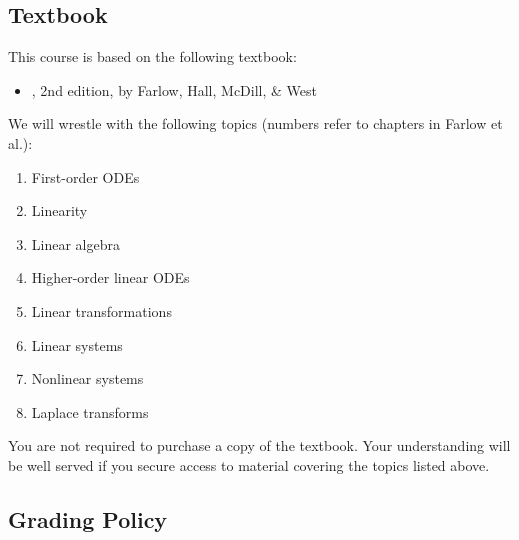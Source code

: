 \subsection{Textbook}

This course is based on the following textbook:
\begin{itemize}
\item \href{https://www.pearson.com/us/higher-education/program/Farlow-Differential-Equations-and-Linear-Algebra-Classic-Version-2nd-Edition/PGM1714691.html}{}, 2nd edition, by Farlow, Hall, McDill, \&{} West
\end{itemize}
We will wrestle with the following topics (numbers refer to chapters in Farlow et al.):
\begin{multicols}{2}
\begin{enumerate}
\setcounter{enumi}{0}
\item First-order ODEs
\item Linearity
\item Linear algebra
\item Higher-order linear ODEs
\item Linear transformations
\item Linear systems
\item Nonlinear systems
\item Laplace transforms
\end{enumerate}
\end{multicols}
\noindent{}You are not required to purchase a copy of the textbook. Your understanding will be well served if you secure access to material covering the topics listed above.





%
%
%
%

\subsection{Grading Policy}

